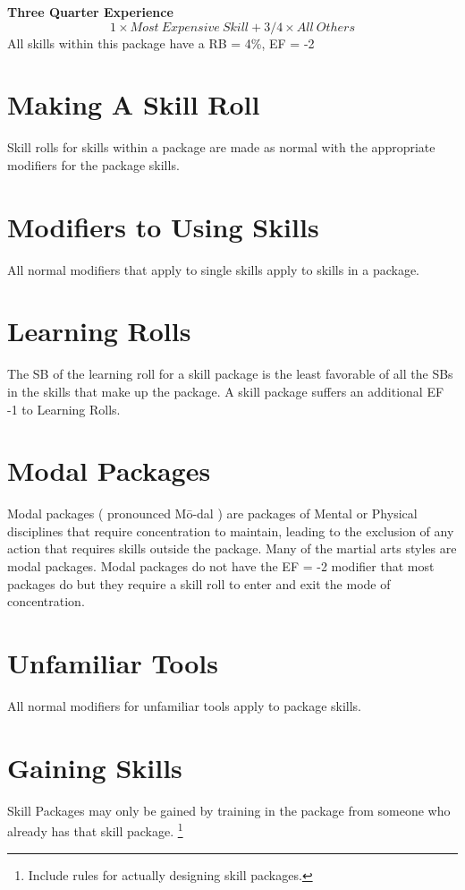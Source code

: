 {\bf Three Quarter Experience}
\[ 1 \times Most\ Expensive\ Skill + 3/4 \times All\ Others \] 
All skills within this package have a RB = 4\%, EF = -2

\section{Making A Skill Roll} 

Skill rolls for skills within a package are made as normal with the
appropriate modifiers for the package skills.

\section{Modifiers to Using Skills}
All normal modifiers that apply to single skills apply to skills in a package.

\section{Learning Rolls}
The SB of the learning roll for a skill package is the least favorable 
of all the SBs in the skills that make up the package. A skill package 
suffers an additional EF -1 to Learning Rolls.

\section{Modal Packages}

Modal packages ( pronounced M\=o-dal ) are packages of Mental or Physical disciplines 
that require concentration to maintain, leading to the exclusion of any action that
requires skills outside the package. Many of the martial arts styles are modal
packages.  Modal packages do not have the EF = -2 modifier that most packages do
but they require a skill roll to enter and exit the mode of concentration.

\section{Unfamiliar Tools}
All normal modifiers for unfamiliar tools apply to package skills.

\section{Gaining Skills}
Skill Packages may only be gained by training in the package from
someone who already has that skill package. \footnote{ Include rules for 
actually designing skill packages. }

